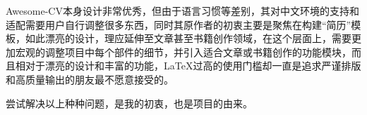 Awesome-CV本身设计非常优秀，但由于语言习惯等差别，其对中文环境的支持和适配需要用户自行调整很多东西，同时其原作者的初衷主要是聚焦在构建“简历”模板，如此漂亮的设计，理应延伸至文章甚至书籍创作领域，在这个层面上，需要更加宏观的调整项目中每个部件的细节，并引入适合文章或书籍创作的功能模块，而且相对于漂亮的设计和丰富的功能，{\LaTeX}过高的使用门槛却一直是追求严谨排版和高质量输出的朋友最不愿意接受的。

尝试解决以上种种问题，是我的初衷，也是{\dk}项目的由来。


\clearpage
